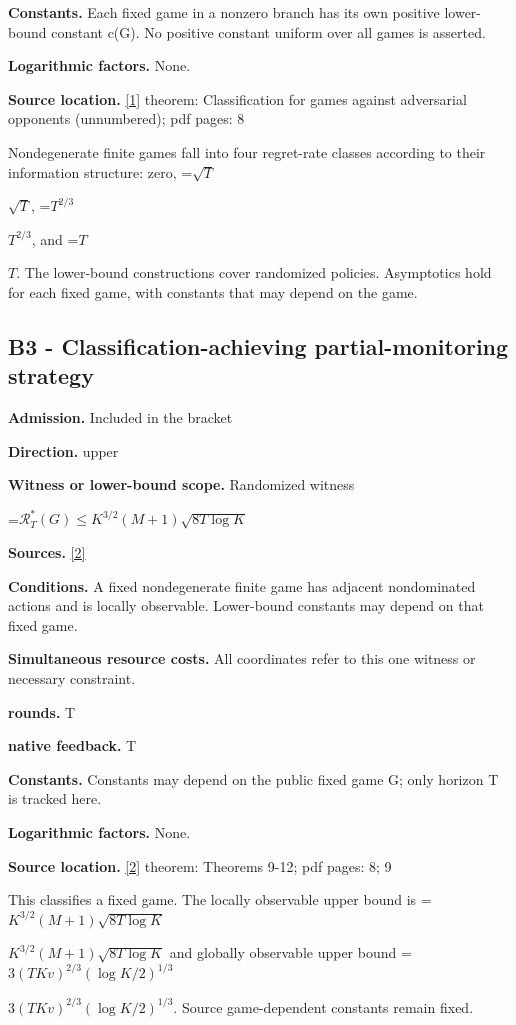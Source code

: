 \documentclass[10pt,a4paper]{article}
\newcommand{\AtlasMath}[1]{\par\begingroup\centering\setbox0=\hbox{$\displaystyle #1$}\ifdim\wd0>1.4\linewidth\typeout{ATLAS WIDE FORMULA: \the\wd0}\fi\ifdim\wd0>\linewidth\resizebox{\linewidth}{!}{\box0}\else\box0\fi\par\endgroup}
\newcommand{\AtlasInlineMath}[1]{\begingroup\setbox0=\hbox{$#1$}\ifdim\wd0>.4\linewidth\endgroup\AtlasMath{#1}\else\endgroup$#1$\fi}
\begin{document}
\textbf{Constants.} Each fixed game in a nonzero branch has its own positive lower-bound constant c(G). No positive constant uniform over all games is asserted.

\textbf{Logarithmic factors.} None.

\textbf{Source location.} \href{https://sites.ualberta.ca/~szepesva/papers/partial_monitoring-mor.pdf}{[1]} theorem: Classification for games against adversarial opponents (unnumbered); pdf pages: 8

Nondegenerate finite games fall into four regret-rate classes according to their information structure: zero, \AtlasInlineMath{\sqrt T}, \AtlasInlineMath{T^{2/3}}, and \AtlasInlineMath{T}. The lower-bound constructions cover randomized policies. Asymptotics hold for each fixed game, with constants that may depend on the game.

\subsection{B3 - Classification-achieving partial-monitoring strategy}
\textbf{Admission.} Included in the bracket

\textbf{Direction.} upper

\textbf{Witness or lower-bound scope.} Randomized witness

\AtlasMath{\mathcal{R}_T^*(G)\le K^{3/2}(M+1)\sqrt{8T\log K}}
\textbf{Sources.} \href{https://proceedings.mlr.press/v99/lattimore19a/lattimore19a.pdf}{[2]}

\textbf{Conditions.} A fixed nondegenerate finite game has adjacent nondominated actions and is locally observable. Lower-bound constants may depend on that fixed game.

\textbf{Simultaneous resource costs.} All coordinates refer to this one witness or necessary constraint.

\textbf{rounds.} T

\textbf{native feedback.} T

\textbf{Constants.} Constants may depend on the public fixed game G; only horizon T is tracked here.

\textbf{Logarithmic factors.} None.

\textbf{Source location.} \href{https://proceedings.mlr.press/v99/lattimore19a/lattimore19a.pdf}{[2]} theorem: Theorems 9-12; pdf pages: 8; 9

This classifies a fixed game. The locally observable upper bound is \AtlasInlineMath{K^{3/2}(M+1)\sqrt{8T\log K}} and globally observable upper bound \AtlasInlineMath{3(TKv)^{2/3}(\log K/2)^{1/3}}. Source game-dependent constants remain fixed.
\end{document}
